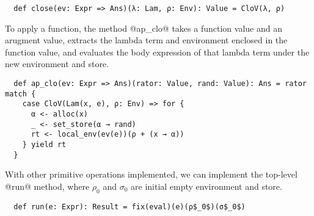 \begin{lstlisting}
  def close(ev: Expr => Ans)(λ: Lam, ρ: Env): Value = CloV(λ, ρ)
\end{lstlisting}

To apply a function, the method @ap_clo@ takes a function value and an arugment
value, extracts the lambda term and environment enclosed in the function value,
and evaluates the body expression of that lambda term under the new environment and store.

\begin{lstlisting}
  def ap_clo(ev: Expr => Ans)(rator: Value, rand: Value): Ans = rator match {
    case CloV(Lam(x, e), ρ: Env) => for {
      α <- alloc(x)
      _ <- set_store(α → rand)
      rt <- local_env(ev(e))(ρ + (x → α))
    } yield rt
  }
\end{lstlisting}

With other primitive operations implemented, we can implement the top-level
@run@ method, where $\rho_0$ and $\sigma_0$ are initial empty environment and
store.

\begin{lstlisting}
  def run(e: Expr): Result = fix(eval)(e)(ρ$_0$)(σ$_0$)
\end{lstlisting}
